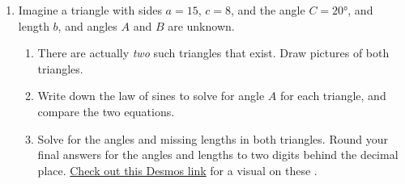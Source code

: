 \begin{myExit}
\begin{enumerate}
		\newpage

		\item Imagine a triangle with sides $a=15$, $c=8$, and the angle $C=\ang{20}$, and length $b$, and angles $A$ and $B$ are unknown.
			\begin{enumerate}
				\item There are actually \emph{two} such triangles that exist. Draw pictures of both triangles.
				\vfill
				\item Write down the law of sines to solve for angle $A$ for each triangle, and compare the two equations.
				\vfill
				\item Solve for the angles and missing lengths in both triangles. Round your final answers for the angles and lengths to two digits behind the decimal place. \href{http://tiny.cc/ambiguous-triangles}{Check out this Desmos link} for a visual on these . 
				\vfill
			\end{enumerate}
		\vfill
	\end{enumerate}
\end{myExit}
